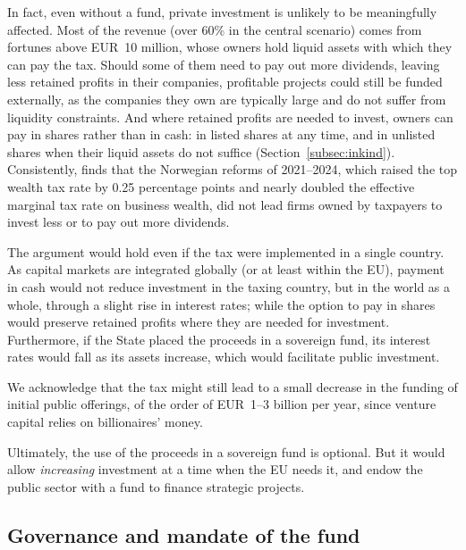 \documentclass[../../main]{subfiles}
\begin{document}
In fact, even without a fund, private investment is unlikely to be meaningfully affected. Most of the revenue (over 60\% in the central scenario) comes from fortunes above EUR~10 million, whose owners hold liquid assets with which they can pay the tax. Should some of them need to pay out more dividends, leaving less retained profits in their companies, profitable projects could still be funded externally, as the companies they own are typically large and do not suffer from liquidity constraints. And where retained profits are needed to invest, owners can pay in shares rather than in cash: in listed shares at any time, and in unlisted shares when their liquid assets do not suffice (Section~\ref{subsec:inkind}). Consistently, \citet{ring_taxing_2026} finds that the Norwegian reforms of 2021--2024, which raised the top wealth tax rate by 0.25 percentage points and nearly doubled the effective marginal tax rate on business wealth, did not lead firms owned by taxpayers to invest less or to pay out more dividends.

The argument would hold even if the tax were implemented in a single country. As capital markets are integrated globally (or at least within the EU), payment in cash would not reduce investment in the taxing country, but in the world as a whole, through a slight rise in interest rates; while the option to pay in shares would preserve retained profits where they are needed for investment. Furthermore, if the State placed the proceeds in a sovereign fund, its interest rates would fall as its assets increase, which would facilitate public investment.

We acknowledge that the tax might still lead to a small decrease in the funding of initial public offerings, of the order of EUR~1--3 billion per year, since venture capital relies on billionaires' money.

Ultimately, the use of the proceeds in a sovereign fund is optional. But it would allow \emph{increasing} investment at a time when the EU needs it, and endow the public sector with a fund to finance strategic projects.


\subsection{Governance and mandate of the fund}
\end{document}
